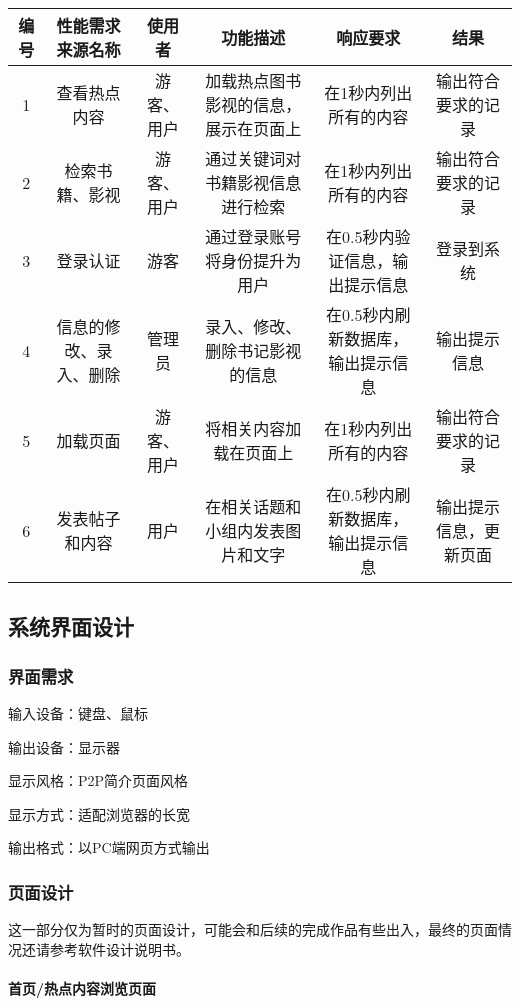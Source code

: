 \documentclass[
]{article}
\begin{document}
\begin{longtable}[]{@{}cccccc@{}}
\toprule
编号 & 性能需求来源名称 & 使用者 & 功能描述 & 响应要求 &
结果\tabularnewline
\midrule
\endhead
1 & 查看热点内容 & 游客、用户 & 加载热点图书影视的信息，展示在页面上 &
在1秒内列出所有的内容 & 输出符合要求的记录\tabularnewline
2 & 检索书籍、影视 & 游客、用户 & 通过关键词对书籍影视信息进行检索 &
在1秒内列出所有的内容 & 输出符合要求的记录\tabularnewline
3 & 登录认证 & 游客 & 通过登录账号将身份提升为用户 &
在0.5秒内验证信息，输出提示信息 & 登录到系统\tabularnewline
4 & 信息的修改、录入、删除 & 管理员 & 录入、修改、删除书记影视的信息 &
在0.5秒内刷新数据库，输出提示信息 & 输出提示信息\tabularnewline
5 & 加载页面 & 游客、用户 & 将相关内容加载在页面上 &
在1秒内列出所有的内容 & 输出符合要求的记录\tabularnewline
6 & 发表帖子和内容 & 用户 & 在相关话题和小组内发表图片和文字 &
在0.5秒内刷新数据库，输出提示信息 &
输出提示信息，更新页面\tabularnewline
\bottomrule
\end{longtable}

\hypertarget{header-n1283}{%
\subsection{系统界面设计}\label{header-n1283}}

\hypertarget{header-n1284}{%
\subsubsection{界面需求}\label{header-n1284}}

输入设备：键盘、鼠标

输出设备：显示器

显示风格：P2P简介页面风格

显示方式：适配浏览器的长宽

输出格式：以PC端网页方式输出

\hypertarget{header-n1290}{%
\subsubsection{页面设计}\label{header-n1290}}

这一部分仅为暂时的页面设计，可能会和后续的完成作品有些出入，最终的页面情况还请参考软件设计说明书。

\hypertarget{header-n1292}{%
\paragraph{首页/热点内容浏览页面}\label{header-n1292}}
\end{document}
